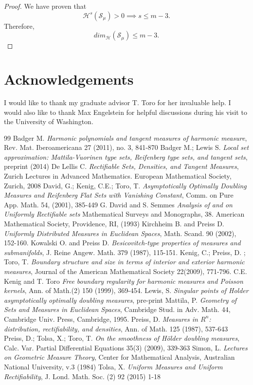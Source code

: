 \documentclass[11pt]{article}
\theoremstyle{definition}
\theoremstyle{remark}
\numberwithin{equation}{section}
\begin{document}
\begin{proof}
We have proven that 
$$ \mathcal{H}^{s}(\mathcal{S}_{\mu})>0 \implies s \leq m-3.$$
Therefore,
$$dim_{\mathcal{H}}(\mathcal{S}_{\mu}) \leq m-3.$$

\end{proof}
  \section*{Acknowledgements}
 I would like to thank my graduate advisor T. Toro for her invaluable help. I would also like to thank Max Engelstein for helpful discussions during his visit to the University of Washington.
\begin{thebibliography}{99}
 Badger M. {\em Harmonic polynomials and  tangent measures of harmonic measure}, Rev. Mat. Iberoamericana 27 (2011), no. 3, 841-870
 Badger M.; Lewis S. {\em Local set approximation: Mattila-Vuorinen type sets, Reifenberg type sets, and tangent sets}, preprint (2014)
     De Lellis C. {\em Rectifiable Sets, Densities, and Tangent Measures}, Zurich Lectures in Advanced Mathematics. European Mathematical Society, Zurich, 2008
      David, G.; Kenig, C.E.; Toro, T. {\em Asymptotically Optimally Doubling Measures and Reifenberg Flat Sets with Vanishing Constant}, Comm. on Pure App. Math. 54, (2001), 385-449
  G. David and S. Semmes {\em Analysis of and on Uniformly Rectifiable sets} Mathematical Surveys and Monographs, 38. American Mathematical Society, Providence, RI, (1993) 
 Kirchheim B.  and  Preiss D. {\em Uniformly Distributed Measures in Euclidean Spaces}, Math. Scand. 90 (2002), 152-160.
    Kowalski O. and Preiss D. {\em Besicovitch-type properties of measures and submanifolds}, J. Reine Angew. Math. 379 (1987), 115-151.
   Kenig, C.; Preiss, D. ; Toro, T. {\em Boundary structure and size in terms of interior and exterior harmonic measures}, Journal of the American Mathematical Society 22(2009), 771-796.
  C.E. Kenig and T. Toro {\em Free boundary regularity for harmonic measures and Poisson kernels}, Ann. of Math.(2) 150 (1999), 369-454.
 Lewis, S. {\em Singular points of Holder asymptotically optimally doubling measures}, pre-print
   Mattila, P. {\em Geometry of Sets and Measures in Euclidean Spaces}, Cambridge Stud. in Adv. Math. 44, Cambridge Univ. Press, Cambridge, 1995.
 Preiss, D. {\em Measures in $R^n$: distribution, rectifiability, and densities}, Ann. of Math. 125 (1987), 537-643
   Preiss, D.; Tolsa, X.; Toro, T. {\em On the smoothness of H\"older doubling measures}, Calc.  Var. Partial Differential Equations 35(3) (2009), 339-363 
 Simon, L.  {\em Lectures on Geometric Measure Theory}, Center for Mathematical Analysis, Australian National University, v.3 (1984)
 Tolsa, X. {\em Uniform Measures and Uniform Rectifiability}, J. Lond. Math. Soc. (2) 92 (2015) 1-18

 

\end{thebibliography}
\end{document}
